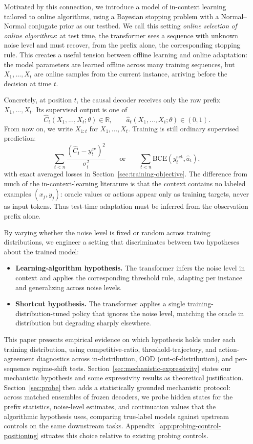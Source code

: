 \documentclass[11pt]{article}
\begin{document}
Motivated by this connection, we introduce a model of in-context learning tailored to online algorithms, using a Bayesian stopping problem with a Normal--Normal conjugate prior as our testbed. We call this setting \emph{online selection of online algorithms}: at test time, the transformer sees a sequence with unknown noise level and must recover, from the prefix alone, the corresponding stopping rule. This creates a useful tension between offline learning and online adaptation: the model parameters are learned offline across many training sequences, but \(X_1,\ldots,X_t\) are online samples from the current instance, arriving before the decision at time \(t\).

Concretely, at position \(t\), the causal decoder receives only the raw prefix \(X_1,\ldots,X_t\). Its supervised output is one of
\[
\widehat C_t(X_1,\ldots,X_t;\theta)\in\mathbb{R},
\qquad
\hat a_t(X_1,\ldots,X_t;\theta)\in(0,1).
\]
From now on, we write \(X_{1:t}\) for \(X_1,\ldots,X_t\).
Training is still ordinary supervised prediction:
\[
\sum_{t<n}\frac{(\widehat C_t-y_t^{\mathrm{cv}})^2}{\sigma_i^2}
\qquad\text{or}\qquad
\sum_{t<n}\mathrm{BCE}(y_t^{\mathrm{act}},\hat a_t),
\]
with exact averaged losses in Section~\ref{sec:training-objective}. The difference from much of the in-context-learning literature is that the context contains no labeled examples \((x_j,y_j)\): oracle values or actions appear only as training targets, never as input tokens. Thus test-time adaptation must be inferred from the observation prefix alone.

By varying whether the noise level is fixed or random across training distributions, we engineer a setting that discriminates between two hypotheses about the trained model:
\begin{itemize}
\item \textbf{Learning-algorithm hypothesis.} The transformer infers the noise level in context and applies the corresponding threshold rule, adapting per instance and generalizing across noise levels.
\item \textbf{Shortcut hypothesis.} The transformer applies a single training-distribution-tuned policy that ignores the noise level, matching the oracle in distribution but degrading sharply elsewhere.
\end{itemize}

This paper presents empirical evidence on which hypothesis holds under each training distribution, using competitive-ratio, threshold-trajectory, and action-agreement diagnostics across in-distribution, OOD (out-of-distribution), and per-sequence regime-shift tests. Section~\ref{sec:mechanistic-expressivity} states our mechanistic hypothesis and some expressivity results as theoretical justification. Section~\ref{sec:probe} then adds a statistically grounded mechanistic protocol: across matched ensembles of frozen decoders, we probe hidden states for the prefix statistics, noise-level estimates, and continuation values that the algorithmic hypothesis uses, comparing true-label models against upstream controls on the same downstream tasks. Appendix~\ref{app:probing-control-positioning} situates this choice relative to existing probing controls.
\end{document}
